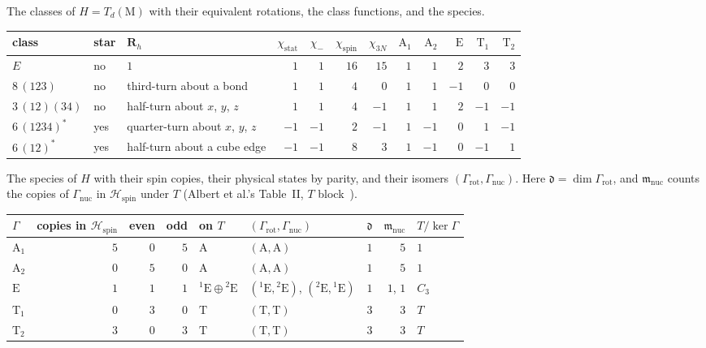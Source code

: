 \documentclass[11pt]{article}
\newenvironment{plaintable}{\par\medskip\noindent\begin{minipage}{\linewidth}\captionsetup{type=table,skip=3pt}\small
  \renewcommand{\arraystretch}{1.05}\setlength{\tabcolsep}{5pt}}{\end{minipage}\par\medskip}
\newcommand{\spin}{\mathcal{H}_{\mathrm{spin}}}
\newcommand{\stat}{\chi_{\mathrm{stat}}}
\newcommand{\Rmat}{\mathbf{R}}
\begin{document}
\begin{plaintable}
\caption{The classes of $H=T_d(\mathrm M)$ with their equivalent rotations, the class functions, and the
species.}
\label{tab:classes}
\centering
\begin{tabular}{@{}lllrrrrrrrrr@{}}
\hline
class & star & $\Rmat_h$ & $\stat$ & $\chi_-$ & $\chi_{\mathrm{spin}}$ & $\chi_{3N}$ & $\mathrm A_1$ & $\mathrm A_2$ & $\mathrm E$ & $\mathrm T_1$ & $\mathrm T_2$\\
\hline
$E$ & no & $1$ & $1$ & $1$ & $16$ & $15$ & $1$ & $1$ & $2$ & $3$ & $3$\\
$8\,(123)$ & no & third-turn about a bond & $1$ & $1$ & $4$ & $0$ & $1$ & $1$ & $-1$ & $0$ & $0$\\
$3\,(12)(34)$ & no & half-turn about $x$, $y$, $z$ & $1$ & $1$ & $4$ & $-1$ & $1$ & $1$ & $2$ & $-1$ & $-1$\\
$6\,(1234)^*$ & yes & quarter-turn about $x$, $y$, $z$ & $-1$ & $-1$ & $2$ & $-1$ & $1$ & $-1$ & $0$ & $1$ & $-1$\\
$6\,(12)^*$ & yes & half-turn about a cube edge & $-1$ & $-1$ & $8$ & $3$ & $1$ & $-1$ & $0$ & $-1$ & $1$\\
\hline
\end{tabular}
\end{plaintable}

\begin{plaintable}
\caption{The species of $H$ with their spin copies, their physical states by parity, and their isomers
$(\Gamma_{\mathrm{rot}},\Gamma_{\mathrm{nuc}})$. Here $\mathfrak d=\dim\Gamma_{\mathrm{rot}}$, and
$\mathfrak m_{\mathrm{nuc}}$ counts the copies of $\Gamma_{\mathrm{nuc}}$ in $\spin$ under $T$ (Albert et
al.'s Table~II, $T$ block~\cite{AlbertEtAlOrientation}).}
\label{tab:isomers}
\centering
\begin{tabular}{@{}lrrrllrrl@{}}
\hline
$\Gamma$ & copies in $\spin$ & even & odd & on $T$ & $(\Gamma_{\mathrm{rot}},\Gamma_{\mathrm{nuc}})$ & $\mathfrak d$ & $\mathfrak m_{\mathrm{nuc}}$ & $T/\ker\Gamma$\\
\hline
$\mathrm A_1$ & $5$ & $0$ & $5$ & $\mathrm A$ & $(\mathrm A,\mathrm A)$ & $1$ & $5$ & $1$\\
$\mathrm A_2$ & $0$ & $5$ & $0$ & $\mathrm A$ & $(\mathrm A,\mathrm A)$ & $1$ & $5$ & $1$\\
$\mathrm E$ & $1$ & $1$ & $1$ & ${}^1\mathrm E\oplus{}^2\mathrm E$ & $({}^1\mathrm E,{}^2\mathrm E)$, $({}^2\mathrm E,{}^1\mathrm E)$ & $1$ & $1$, $1$ & $C_3$\\
$\mathrm T_1$ & $0$ & $3$ & $0$ & $\mathrm T$ & $(\mathrm T,\mathrm T)$ & $3$ & $3$ & $T$\\
$\mathrm T_2$ & $3$ & $0$ & $3$ & $\mathrm T$ & $(\mathrm T,\mathrm T)$ & $3$ & $3$ & $T$\\
\hline
\end{tabular}
\end{plaintable}
\end{document}
